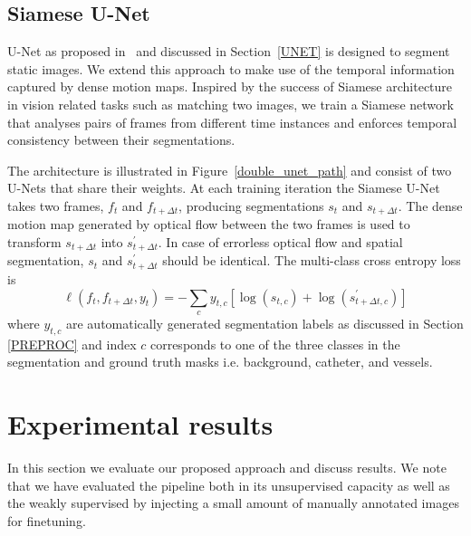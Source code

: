 \documentclass{bmvc2k}
\begin{document}
\subsection{Siamese U-Net \label{SEGPATH}}
U-Net as proposed in~\cite{unet} and discussed in Section~\ref{UNET} is designed to segment static images. We  extend this approach to make use of the temporal information captured by dense motion maps. Inspired by the success of Siamese architecture in vision related tasks such as matching two images, we train a Siamese network that analyses pairs of frames from different time instances and enforces temporal consistency between their segmentations. 


The architecture is illustrated in Figure~\ref{double_unet_path} and consist of two U-Nets that share their weights. 
At each training iteration the Siamese U-Net takes two frames, $f_t$ and $f_{t+\Delta t}$, producing segmentations $s_{t}$ and $s_{t+\Delta t}$. The dense motion map  generated by optical flow between the two frames is used to transform  $s_{t+\Delta t}$ into $s^{\prime}_{t+\Delta t}$. In case of errorless optical flow and spatial segmentation, $s_{t}$ and $s^{\prime}_{t+\Delta t}$ should be identical. The multi-class cross entropy loss is  
\begin{equation}
\ell(f_{t},f_{t+\Delta t},y_{t})=-\sum_{c}y_{t,c} [\log(s_{t,c}) +\log(s^{\prime}_{t+\Delta t,c})]
\label{eq:loss}
\end{equation}
where $y_{t,c}$ are automatically generated segmentation labels as discussed in Section \ref{PREPROC} and index $c$ corresponds to one of the three classes in the segmentation and ground truth masks i.e. background, catheter,  and vessels.






\section{Experimental results}
In this section we  evaluate our proposed approach and discuss results. We note that we have evaluated the pipeline both in its unsupervised capacity as well as the weakly supervised by injecting a small amount of manually annotated images for finetuning. 
\end{document}
